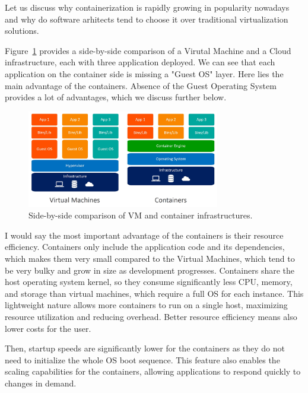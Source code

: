 Let us discuss why containerization is rapidly growing in popularity nowadays and why do software arhitects tend to choose it over traditional virtualization solutions.

Figure~\ref{img:containers-vs-virtual-machines} provides a side-by-side comparison of a Virutal Machine and a Cloud infrastructure, each with three application deployed. We can see that each application on the container side is missing a "Guest OS" layer. Here lies the main advantage of the containers. Absence of the Guest Operating System provides a lot of advantages, which we discuss further below.

\begin{figure}[!hbt]
	\begin{center}
		\includegraphics[width=0.75\textwidth]{images/containers-vs-virtual-machines.jpg}
        \caption{Side-by-side comparison of VM and container infrastructures.}
		\label{img:containers-vs-virtual-machines}
	\end{center}
\end{figure}

I would say the most important advantage of the containers is their resource efficiency. Containers only include the application code and its dependencies, which makes them very small compared to the Virtual Machines, which tend to be very bulky and grow in size as development progresses. Containers share the host operating system kernel, so they consume significantly less CPU, memory, and storage than virtual machines, which require a full OS for each instance. This lightweight nature allows more containers to run on a single host, maximizing resource utilization and reducing overhead. Better resource efficiency means also lower costs for the user.

Then, startup speeds are significantly lower for the containers as they do not need to initialize the whole OS boot sequence. This feature also enables the scaling capabilities for the containers, allowing applications to respond quickly to changes in demand.

